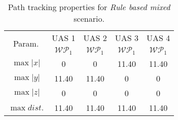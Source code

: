     \begin{table}[H]
        \centering
        \begin{tabular}{c||c|c|c|c}
            \multirow{2}{*}{Param.} & UAS 1     & UAS 2             & UAS 3             & UAS 4 \\\cline{2-5}
                            & $\mathscr{WP}_1$  & $\mathscr{WP}_1$  & $\mathscr{WP}_1$  & $\mathscr{WP}_1$ \\\hline\hline
              $\max |x|$    & 0                 & 0                 & 11.40             & 11.40\\\hline
              $\max |y|$    & 11.40             & 11.40             & 0                 & 0\\\hline
              $\max |z|$    & 0                 & 0                 & 0                 & 0\\\hline
              $\max dist.$  & 11.40             & 11.40             & 11.40              & 11.40\\
        \end{tabular}
        \caption{Path tracking properties for \emph{Rule based mixed} scenario.}
        \label{tab:pathTrackingParametersForRuleBasedMixed}
    \end{table}